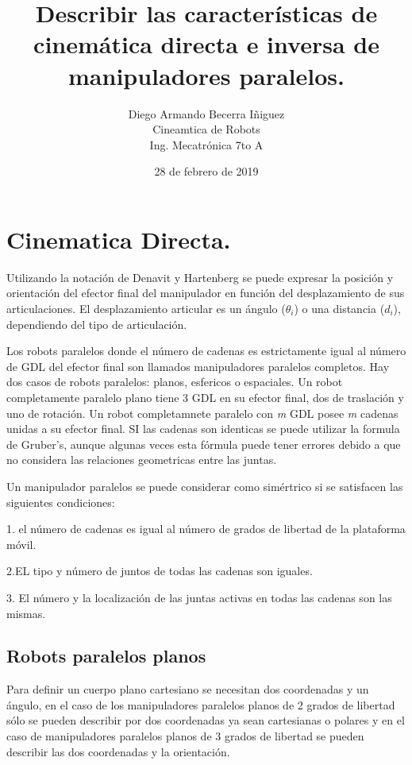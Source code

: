 \documentclass[letter,openrigh,12pt,spanish]{report}
\title{\textbf{Describir las caracter\'isticas de cinem\'atica directa e inversa de manipuladores paralelos.}}
\author{Diego Armando Becerra Iñiguez\\
		Cineamtica de Robots\\
		Ing. Mecatr\'onica 7to A}
\date{28 de febrero de 2019}
\begin{document}
\maketitle

\section{Cinematica Directa.}

Utilizando la notaci\'on de Denavit y Hartenberg se puede expresar la posici\'on y orientaci\'on del efector final del manipulador en funci\'on del desplazamiento de sus articulaciones. El desplazamiento articular es un \'angulo ($\theta_i$) o una distancia ($d_i$), dependiendo del tipo de articulaci\'on.

Los robots paralelos donde el n\'umero de cadenas es estrictamente igual al n\'umero de GDL del efector final son llamados manipuladores paralelos completos. Hay dos casos de robots paralelos: planos, esfericos o espaciales. Un robot completamente paralelo plano tiene 3 GDL en su efector final, dos de traslaci\'on y uno de rotaci\'on. Un robot completamnete paralelo con \textit{m} GDL posee \textit{m} cadenas unidas a su efector final. SI las cadenas son identicas se puede utilizar la formula de Gruber's, aunque algunas veces esta f\'ormula puede tener errores debido a que no considera las relaciones geometricas entre las juntas.

Un manipulador paralelos se puede considerar como sim\'ertrico si se satisfacen las siguientes condiciones:

1. el n\'umero de cadenas es igual al n\'umero de grados de libertad de la plataforma m\'ovil.

2.EL tipo y n\'umero de juntos de todas las cadenas son iguales.

3. El n\'umero y la localizaci\'on de las juntas activas en todas las cadenas son las mismas.

\subsection{Robots paralelos planos}

Para definir un cuerpo plano cartesiano se necesitan dos coordenadas y un \'angulo, en el caso de los manipuladores paralelos planos de 2 grados de libertad s\'olo se pueden describir por dos coordenadas ya sean cartesianas o polares y en el caso de manipuladores paralelos planos de 3 grados de libertad se pueden describir las dos coordenadas y la orientaci\'on.
\end{document}
